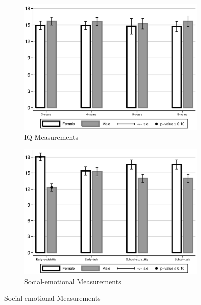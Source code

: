 \begin{figure}
\begin{center}
\caption{Differences Between ABC/CARE Males and Females, Skill Measurements}
\label{fig:intro-skills-plots}
\begin{subfigure}[b]{0.49\textwidth}
	\caption{IQ Measurements}
	\label{fig:intro-skills-plots-cog}
	\includegraphics[width=\textwidth]{../output/abccare-gdiff-cog}
\end{subfigure}
\begin{subfigure}[b]{0.49\textwidth}
	\caption{Social-emotional Measurements}
	\label{fig:intro-skills-plots-ncog}
	\includegraphics[width=\textwidth]{../output/abccare-gdiff-ncog}
\end{subfigure}


\end{center}
\end{figure}
